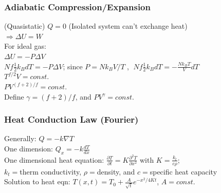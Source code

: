 \documentclass[letterpaper,landscape,10pt]{article}
\begin{document}
{\begin{multicols}{4}
  \subsubsection*{Adiabatic Compression/Expansion} (Quasistatic)
    $Q=0$ (Isolated system can't exchange heat)\\
	$\Rightarrow \Delta U = W$\\
	For ideal gas:\\
	\hspace{5pt}$\Delta U = -P \Delta V$ \\
	\hspace{5pt}$Nf\frac{1}{2}k_BdT = -P \Delta V$; since $P=Nk_BV/T\;$, $\;Nf\frac{1}{2}k_BdT = -\frac{Nk_BT}{V}dT$\\
	\hspace{5pt}$T^{f/2}V=const.$\\
	\hspace{5pt}$PV^{(f+2)/f}=const.$\\
	\hspace{5pt}Define $\gamma = (f+2)/f$, and $PV^\gamma=const.$
  \subsubsection*{Heat Conduction Law (Fourier)} 
  Generally: $Q = -k \nabla T$ \\
  One dimension: $Q_x = -k \frac{dT}{dx}$ \\
  One dimensional heat equation: $\frac{\partial T}{\partial t}= K \frac{\partial^2 T}{\partial x^2}$ with $K=\frac{k_t}{c\rho}$; \\
  $k_t=$therm conductivity, $\rho=$density, and $c=$specific heat capacity\\
  Solution to heat eqn: $T(x,t) = T_0 + \frac{A}{\sqrt{t}}e^{-x^2/4Kt}$, $A=const.$

\end{multicols}}
\end{document}

